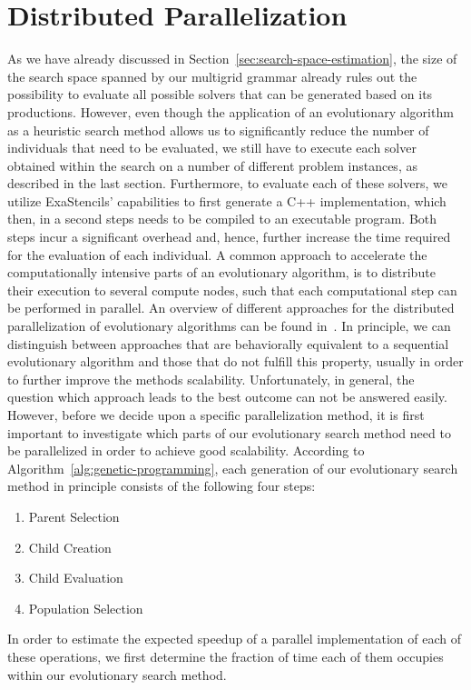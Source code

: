 \section{Distributed Parallelization}
As we have already discussed in Section~\ref{sec:search-space-estimation}, the size of the search space spanned by our multigrid grammar already rules out the possibility to evaluate all possible solvers that can be generated based on its productions.
However, even though the application of an evolutionary algorithm as a heuristic search method allows us to significantly reduce the number of individuals that need to be evaluated, we still have to execute each solver obtained within the search on a number of different problem instances, as described in the last section.
Furthermore, to evaluate each of these solvers, we utilize ExaStencils' capabilities to first generate a C++ implementation, which then, in a second steps needs to be compiled to an executable program.
Both steps incur a significant overhead and, hence, further increase the time required for the evaluation of each individual.
A common approach to accelerate the computationally intensive parts of an evolutionary algorithm, is to distribute their execution to several compute nodes, such that each computational step can be performed in parallel.
An overview of different approaches for the distributed parallelization of evolutionary algorithms can be found in~\cite{gong2015distributed}.
In principle, we can distinguish between approaches that are behaviorally equivalent to a sequential evolutionary algorithm and those that do not fulfill this property, usually in order to further improve the methods scalability.
Unfortunately, in general, the question which approach leads to the best outcome can not be answered easily.
However, before we decide upon a specific parallelization method, it is first important to investigate which parts of our evolutionary search method need to be parallelized in order to achieve good scalability.
According to Algorithm~\ref{alg:genetic-programming}, each generation of our evolutionary search method in principle consists of the following four steps:
\begin{enumerate}
	\item Parent Selection
	\item Child Creation
	\item Child Evaluation
	\item Population Selection
\end{enumerate}
In order to estimate the expected speedup of a parallel implementation of each of these operations, we first determine the fraction of time each of them occupies within our evolutionary search method.
